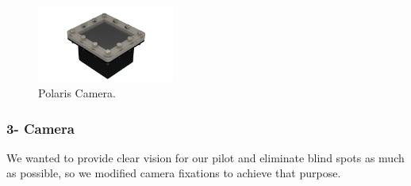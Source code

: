 \documentclass[a4paper,12pt,leqno]{report}
\begin{document}
\begin{figure}
\centering
\includegraphics[width=0.4\textwidth,height= .105\textheight]{Untitled Project_Camera_Default Camera}
	\caption{Polaris Camera.}
\end{figure}

\textcolor{orange!60}{
\subsubsection{3- Camera}}
We wanted to provide clear vision for our pilot and eliminate blind  spots as much as possible, so we modified camera fixations to  achieve that purpose.
\\
\end{document}
